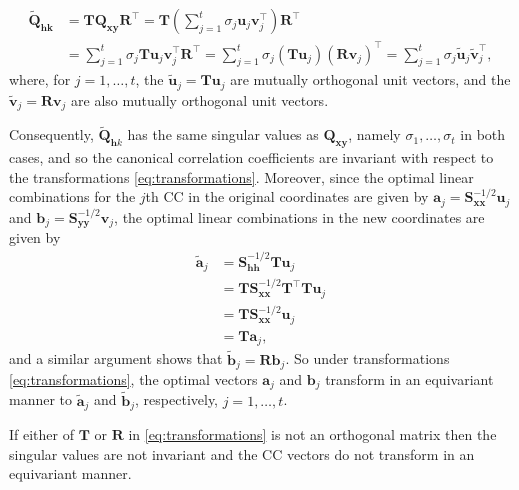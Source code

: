 \documentclass[
]{book}
\theoremstyle{definition}
\theoremstyle{definition}
\theoremstyle{definition}
\theoremstyle{definition}
\theoremstyle{remark}
\begin{document}
\begin{align*}
\tilde{\mathbf Q}_{\mathbf h\mathbf k}&={\mathbf T }\mathbf Q_{\mathbf x\mathbf y}{\mathbf R}^\top
={\mathbf T} \left ( \sum_{j=1}^t \sigma_j {\mathbf u}_j {\mathbf v}_j^\top \right){\mathbf R}^\top\\
&=\sum_{j=1}^t \sigma_j {\mathbf T}{\mathbf u}_j {\mathbf v}_j^\top {\mathbf R}^\top
=\sum_{j=1}^t \sigma_j \left ( {\mathbf T} {\mathbf u}_j \right )\left ({\mathbf R}{\mathbf v}_j  \right )^\top
=\sum_{j=1}^t \sigma_j \tilde{\mathbf u}_j \tilde{\mathbf v}_j^\top,
\end{align*}
where, for \(j=1, \ldots,t\), the \(\tilde{\mathbf u}_j={\mathbf T}\mathbf u_j\) are mutually orthogonal unit vectors,
and the \(\tilde{\mathbf v}_j={\mathbf R}{\mathbf v}_j\) are also mutually orthogonal unit vectors.

Consequently, \(\tilde{\mathbf Q}_{\mathbf h k}\) has the same singular values as \(\mathbf Q_{\mathbf x\mathbf y}\), namely \(\sigma_1, \ldots , \sigma_t\) in both cases, and so the canonical correlation coefficients are invariant with respect to the transformations \eqref{eq:transformations}. Moreover, since the optimal linear combinations for the \(j\)th CC in the original coordinates are given by \(\mathbf a_j =\mathbf S_{\mathbf x\mathbf x}^{-1/2}{\mathbf u}_j\) and \(\mathbf b_j=\mathbf S_{\mathbf y\mathbf y}^{-1/2}{\mathbf v}_j\), the optimal linear combinations in the new coordinates are given by
\begin{align*}
\tilde{\mathbf a}_{j}&=\mathbf S_{\mathbf h\mathbf h}^{-1/2}{\mathbf T}{\mathbf u}_j\\
&={\mathbf T}\mathbf S_{\mathbf x\mathbf x}^{-1/2}{\mathbf T}^\top {\mathbf T}{\mathbf u}_j\\
&={\mathbf T}\mathbf S_{\mathbf x\mathbf x}^{-1/2}{\mathbf u}_j \\
&={\mathbf T}\mathbf a_{j},
\end{align*}
and a similar argument shows that \(\tilde{\mathbf b}_{j}={\mathbf R}\mathbf b_{j}\). So under transformations \eqref{eq:transformations},
the optimal vectors \(\mathbf a_{j}\) and \(\mathbf b_{j}\) transform in an equivariant manner to \(\tilde{\mathbf a}_{j}\) and \(\tilde{\mathbf b}_{j}\), respectively, \(j=1, \ldots , t\).

If either of \(\mathbf T\) or \(\mathbf R\) in \eqref{eq:transformations} is not an orthogonal matrix then the singular values are not invariant and the CC vectors do not transform in an equivariant manner.
\end{document}
